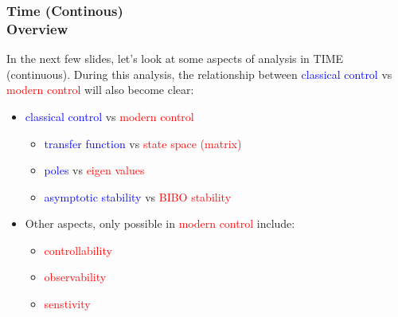 \documentclass[hyperref={pdfpagelabels=true}]{beamer}
\begin{document}
\begin{frame}
\frametitle{Time (Continous) \\ {\large Overview}}
In the next few slides, let's look at some aspects of
analysis in TIME (continuous). During this analysis, the
relationship between \textcolor{blue}{classical control} vs \textcolor{red}{modern control}
will also become clear:
\begin{itemize}
\item[\ding{39}] \textcolor{blue}{classical control} vs \textcolor{red}{modern control}
    \begin{itemize}
     \item[\ding{40}] \textcolor{blue}{transfer function} vs \textcolor{red}{state space (matrix)}
     \item[\ding{40}] \textcolor{blue}{poles} vs \textcolor{red}{eigen values}
    \item[\ding{40}] \textcolor{blue}{asymptotic stability} vs \textcolor{red}{BIBO stability}
   \end{itemize}
\item[\ding{39}] Other aspects, only possible in \textcolor{red}{modern control}
include:
    \begin{itemize}
    \item[\ding{40}] \textcolor{red}{controllability}
    \item[\ding{40}] \textcolor{red}{observability}
    \item[\ding{40}] \textcolor{red}{senstivity}
    \end{itemize}
\end{itemize}
\end{frame}
\end{document}
